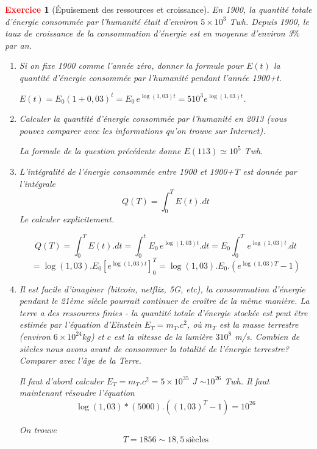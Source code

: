 \documentclass[11pt]{article}
\theoremstyle{mythmstyle}
\newtheorem{exo}{\textcolor{red}{\textbf{Exercice}}}
\begin{document}
\begin{exo}[Épuisement des ressources et croissance]
En 1900, la quantité totale d'énergie consommée par l'humanité était d'environ $5 \times 10^3$ Twh. Depuis 1900, le taux de croissance de la consommation d’énergie est en moyenne d’environ 3$\%$ par an. 
\begin{enumerate}
\item Si on fixe 1900 comme l'année zéro, donner la formule pour $E(t)$ la quantité d'énergie consommée par l'humanité pendant l'année 1900+t.

\begin{solution}
$E(t)=E_0(1+0,03)^t= E_0\, e^{\log (1,03)t}= 5 10^3 e^{\log (1,03)t}$.
\end{solution}
   
\item Calculer la quantité d'énergie consommée par l'humanité en 2013 (vous pouvez comparer avec les informations qu'on trouve sur  Internet).

\begin{solution}
    La formule de la question précédente donne $E(113) \simeq 10^5$ Twh.
\end{solution}

   \item L'intégralité de l'énergie consommée entre 1900 et 1900+T est donnée par l'intégrale
     $$Q(T)= \int_{0}^T E(t).dt$$
     Le calculer explicitement.
     
\begin{solution}
     $$Q(T)= \int_{0}^T E(t).dt= \int_{0}^t E_0\, e^{\log (1,03)t}.dt=E_0 \int_{0}^T \, e^{\log (1,03)t}.dt $$
     $$
     = \log (1,03).E_0 [ e^{\log (1,03)t}]_{0}^{T}= \log (1,03).E_0.(e^{\log (1,03)T}-1)
     $$
\end{solution}

    \item  Il est facile d'imaginer (bitcoin, netflix, 5G, etc), la consommation d'énergie pendant le 21ème siècle pourrait continuer de croître de la même manière. La terre a des ressources finies - la quantité totale d'énergie stockée est peut être estimée par l'équation d'Einstein $E_T = m_T.c^2$, où $m_T$ est la masse terrestre (environ $6\times 10^{24} kg$) et $c$ est la vitesse de la lumière $3 10^8$ m/s. Combien de siècles nous avons avant de consommer la totalité de l'énergie terrestre? Comparer avec l'âge de la Terre.
    
\begin{solution}
    Il faut d'abord calculer $E_T=m_T. c^2= 5\times 10^{35}$ J $\sim 10^{26}$ Twh. Il faut maintenant résoudre l'équation
     $$
     \log (1,03)*(5000).((1,03)^T-1)=10^{26}
     $$
     
     On trouve 
     $$T=1856\sim 18,5 \,\text{siècles}$$
     
\end{solution}
\end{enumerate}
\end{exo}
\end{document}
